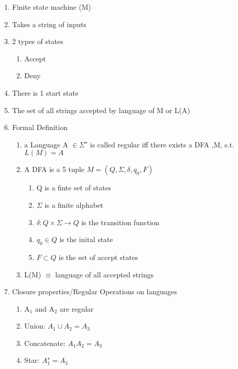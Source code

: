 \documentclass[11pt]{article}
\begin{document}
\begin{enumerate}
\item Finite state machine (M)
\item Takes a string of inputs
\item 2 types of states

\begin{enumerate}
\item Accept
\item Deny
\end{enumerate}

\item There is 1 start state
\item The set of all strings accepted by language of M or L(A)
\item Formal Definition

\begin{enumerate}
\item a Language A $\in \Sigma^{\star}$ is called regular iff there
        exists a DFA ,M, s.t. $L(M) = A$
\item A DFA is a 5 tuple $M = (Q,\Sigma, \delta, q_0, F)$

\begin{enumerate}
\item Q is a finte set of states
\item $\Sigma$ is a finite alphabet
\item $\delta: Q\times\Sigma \rightarrow Q$ is the transition function
\item $q_0 \in Q$  is the inital state
\item $F \subset Q$ is the set of accept states
\end{enumerate}

\item L(M) $\equiv$ language of all accepted strings
\end{enumerate}

\item Closure properties/Regular Operations on languages

\begin{enumerate}
\item A$_1$ and A$_2$ are regular
\item Union: $A_1 \cup A_2 = A_3$
\item Concatenate: $A_1 A_2 = A_3$
\item Star: $A_1^{\star} = A_3$
\end{enumerate}

\end{enumerate}
\end{document}
